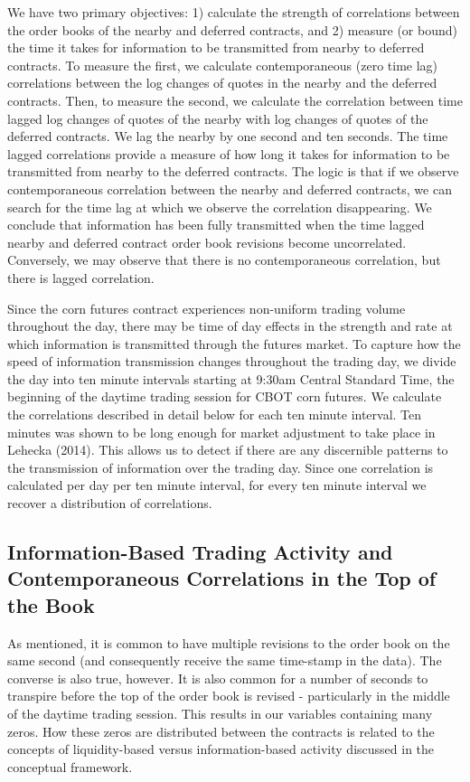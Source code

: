 \documentclass[]{elsarticle} %
\begin{document}
We have two primary objectives: 1) calculate the strength of
correlations between the order books of the nearby and deferred
contracts, and 2) measure (or bound) the time it takes for information
to be transmitted from nearby to deferred contracts. To measure the
first, we calculate contemporaneous (zero time lag) correlations between
the log changes of quotes in the nearby and the deferred contracts.
Then, to measure the second, we calculate the correlation between time
lagged log changes of quotes of the nearby with log changes of quotes of
the deferred contracts. We lag the nearby by one second and ten seconds.
The time lagged correlations provide a measure of how long it takes for
information to be transmitted from nearby to the deferred contracts. The
logic is that if we observe contemporaneous correlation between the
nearby and deferred contracts, we can search for the time lag at which
we observe the correlation disappearing. We conclude that information
has been fully transmitted when the time lagged nearby and deferred
contract order book revisions become uncorrelated. Conversely, we may
observe that there is no contemporaneous correlation, but there is
lagged correlation.

Since the corn futures contract experiences non-uniform trading volume
throughout the day, there may be time of day effects in the strength and
rate at which information is transmitted through the futures market. To
capture how the speed of information transmission changes throughout the
trading day, we divide the day into ten minute intervals starting at
9:30am Central Standard Time, the beginning of the daytime trading
session for CBOT corn futures. We calculate the correlations described
in detail below for each ten minute interval. Ten minutes was shown to
be long enough for market adjustment to take place in Lehecka (2014).
This allows us to detect if there are any discernible patterns to the
transmission of information over the trading day. Since one correlation
is calculated per day per ten minute interval, for every ten minute
interval we recover a distribution of correlations.

\subsection{Information-Based Trading Activity and Contemporaneous
Correlations in the Top of the
Book}\label{information-based-trading-activity-and-contemporaneous-correlations-in-the-top-of-the-book}

As mentioned, it is common to have multiple revisions to the order book
on the same second (and consequently receive the same time-stamp in the
data). The converse is also true, however. It is also common for a
number of seconds to transpire before the top of the order book is
revised - particularly in the middle of the daytime trading session.
This results in our variables containing many zeros. How these zeros are
distributed between the contracts is related to the concepts of
liquidity-based versus information-based activity discussed in the
conceptual framework.
\end{document}
